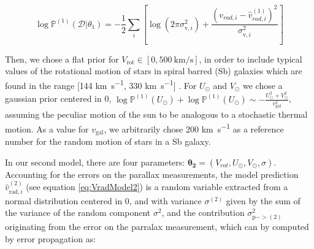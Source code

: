 \begin{equation}\label{Eq:LogLikeMod1}
    \log \mathbb{P}^{(1)}(\mathcal{D} \vert \theta_1) = -\frac{1}{2}\sum_i[\log(2\pi\sigma_{\text{v},i}^2)+\frac{(v_{rad,i} - \hat{v}_{rad,i}^{(1)})^2}{\sigma_{\text{v},i}^2}]
\end{equation}

Then, we chose a flat prior for $V_{\text{rot}}\in[0,\qty{500}{\kilo\meter\per\second}]$, in order to include typical values of the rotational motion of stars in spiral barred (Sb) galaxies which are found in the range [144 \unit{\kilo\meter\per\second}, 330 \unit{\kilo\meter\per\second}] \cite{Schneider2015}. For $U_\odot$ and $V_\odot$ we chose a gaussian prior centered in 0, $\log\mathbb{P}^{(1)}(U_\odot) + \log\mathbb{P}^{(1)}(U_\odot) \sim - \frac{U_\odot^2 + V_{\odot}^2}{v_{\text{gal}}^2}$, assuming the peculiar motion of the sun to be analogous to a stochastic thermal motion. %
As a value for $v_{\text{gal}}$, we arbitrarily chose 200 \unit{\kilo\meter\per\second} as a reference number for the random motion of stars in a Sb galaxy.

In our second model, there are four parameters: $\mathbf{\theta_2} = (V_{rot}, U_{\odot}, V_{\odot}, \sigma)$. 
Accounting for the errors on the parallax measurements, the model prediction $\hat{v}^{(2)}_{\text{rad}, i}$ (see equation \ref{eq:VradModel2}) is a random variable extracted from a normal distribution centered in 0, and with variance $\sigma^(2)$ given by the sum of the variance of the random component $\sigma^2$, and the contribution $\sigma^2_{\text{p} -> (2)}$ originating from the error on the parralax measurement, which can by computed by error propagation as:

